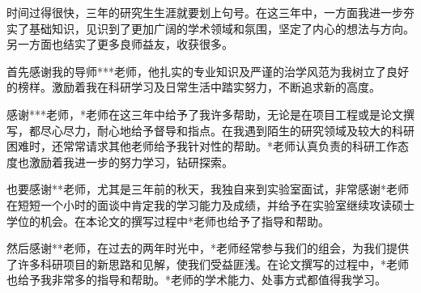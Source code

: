 \documentclass[promaster]{thesis-uestc}
\begin{document}

%
%
%
%
%
%
%


\thesisacknowledgement

时间过得很快，三年的研究生生涯就要划上句号。在这三年中，一方面我进一步夯实了基础知识，见识到了更加广阔的学术领域和氛围，坚定了内心的想法与方向。另一方面也结实了更多良师益友，收获很多。

首先感谢我的导师***老师，他扎实的专业知识及严谨的治学风范为我树立了良好的榜样。激励着我在科研学习及日常生活中踏实努力，不断追求新的高度。

感谢***老师，*老师在这三年中给予了我许多帮助，无论是在项目工程或是论文撰写，都尽心尽力，耐心地给予督导和指点。在我遇到陌生的研究领域及较大的科研困难时，还常常请求其他老师给予我针对性的帮助。*老师认真负责的科研工作态度也激励着我进一步的努力学习，钻研探索。

也要感谢**老师，尤其是三年前的秋天，我独自来到实验室面试，非常感谢*老师在短短一个小时的面谈中肯定我的学习能力及成绩，并给予在实验室继续攻读硕士学位的机会。在本论文的撰写过程中*老师也给予了指导和帮助。

然后感谢**老师，在过去的两年时光中，*老师经常参与我们的组会，为我们提供了许多科研项目的新思路和见解，使我们受益匪浅。在论文撰写的过程中，*老师也给予我非常多的指导和帮助。*老师的学术能力、处事方式都值得我学习。
\end{document}
